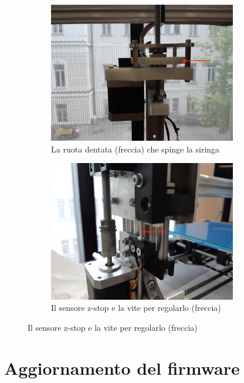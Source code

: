 \documentclass[12pt]{article}
\begin{document}
	\begin{figure}[H]
        \begin{subfigure}{0.5\textwidth}
                \includegraphics[width=0.9\textwidth]{img/extruder.jpg}
                \caption*{La ruota dentata (freccia) che spinge la siringa}
        \end{subfigure}
        \begin{subfigure}{0.5\textwidth}
                \includegraphics[width=0.9\textwidth]{img/zstop.jpg}
                \caption*{Il sensore z-stop e la vite per regolarlo (freccia)}
         \end{subfigure}
	\end{figure}
	
	\newpage
	

\section{Aggiornamento del firmware}
\end{document}
